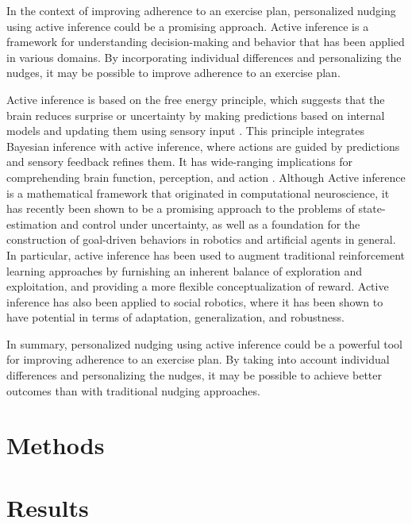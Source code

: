 \documentclass[manuscript,screen,review]{acmart}
\begin{document}
In the context of improving adherence to an exercise plan, personalized nudging using active inference could be a promising approach. Active inference is a framework for understanding decision-making and behavior that has been applied in various domains. By incorporating individual differences and personalizing the nudges, it may be possible to improve adherence to an exercise plan.

Active inference is based on the free energy principle, which suggests that the brain reduces surprise or uncertainty
 by making predictions based on internal models and updating them using sensory input \cite{mann2022free}. This
 principle integrates  Bayesian inference with active inference, where actions are guided by predictions and sensory feedback refines them.
  It has wide-ranging implications for comprehending brain function, perception, and action
  \cite{bruineberg2018anticipating}. Although Active inference is a mathematical framework that originated in
  computational neuroscience, it has recently been shown to be a promising approach to the problems of
  state-estimation and control under uncertainty, as well as a foundation for the construction of goal-driven
  behaviors in robotics and artificial agents in general\cite{lanillos2021active}. In particular, active inference
  has been used to augment traditional reinforcement learning approaches by furnishing an inherent balance of
  exploration and exploitation, and providing a more flexible conceptualization of
  reward\cite{tschantz2020reinforcement}. Active inference has also been applied to social robotics, where it has
  been shown to have potential in terms of adaptation, generalization, and robustness\cite{da2022active}.

In summary, personalized nudging using active inference could be a powerful tool for improving adherence to an exercise plan. By taking into account individual differences and personalizing the nudges, it may be possible to achieve better outcomes than with traditional nudging approaches.

\section{Methods}

\section{Results}

\end{document}
